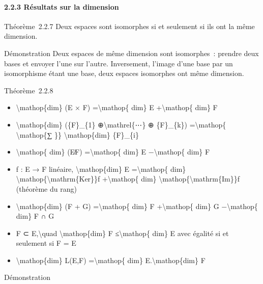 \documentclass[]{article}
\begin{document}
\paragraph{2.2.3 Résultats sur la dimension}

Théorème~2.2.7 Deux espaces sont isomorphes si et seulement si ils ont
la même dimension.

Démonstration Deux espaces de même dimension sont isomorphes~: prendre
deux bases et envoyer l'une sur l'autre. Inversement, l'image d'une base
par un isomorphisme étant une base, deux espaces isomorphes ont même
dimension.

Théorème~2.2.8

\begin{itemize}
\itemsep1pt\parskip0pt
\item
  \textbackslash{}mathop\{dim\} (E × F) =\textbackslash{}mathop\{ dim\}
  E +\textbackslash{}mathop\{ dim\} F
\item
  \textbackslash{}mathop\{dim\} (\{F\}\_\{1\}
  ⊕\textbackslash{}mathrel\{⋯\} ⊕ \{F\}\_\{k\})
  =\textbackslash{}mathop\{ \textbackslash{}mathop\{∑ \}\}
  \textbackslash{}mathop\{dim\} \{F\}\_\{i\}
\item
  \textbackslash{}mathop\{ dim\} (E∕F) =\textbackslash{}mathop\{ dim\} E
  −\textbackslash{}mathop\{ dim\} F
\item
  f : E → F linéaire, \textbackslash{}mathop\{dim\} E
  =\textbackslash{}mathop\{ dim\}
  \textbackslash{}mathop\{\textbackslash{}mathrm\{Ker\}\}f
  +\textbackslash{}mathop\{ dim\}
  \textbackslash{}mathop\{\textbackslash{}mathrm\{Im\}\}f (théorème du
  rang)
\item
  \textbackslash{}mathop\{dim\} (F + G) =\textbackslash{}mathop\{ dim\}
  F +\textbackslash{}mathop\{ dim\} G −\textbackslash{}mathop\{ dim\} F
  ∩ G
\item
  F ⊂ E,\textbackslash{}quad \textbackslash{}mathop\{dim\} F
  ≤\textbackslash{}mathop\{ dim\} E avec égalité si et seulement si F =
  E
\item
  \textbackslash{}mathop\{dim\} L(E,F) =\textbackslash{}mathop\{ dim\}
  E.\textbackslash{}mathop\{dim\} F
\end{itemize}

Démonstration
\end{document}
